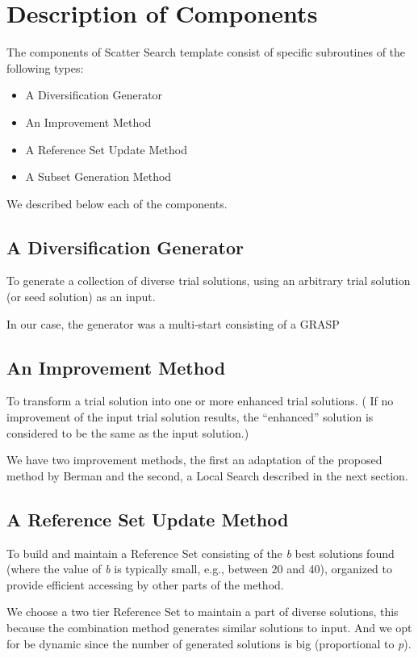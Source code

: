 \section{Description of Components}
The components of Scatter Search template \cite{glover1998template}
consist of
specific subroutines of the following types:
\begin{itemize}
\item A Diversification Generator
\item An Improvement Method
\item A Reference Set Update Method
\item A Subset Generation Method
\end{itemize}
We described below
each of the components.

\subsection{A Diversification Generator}
To generate
a collection of diverse trial solutions,
using an arbitrary trial solution
(or seed solution) as an input.

In our case,
the generator was a multi-start
consisting of a GRASP


\subsection{An Improvement Method}
To transform
a trial solution
into one or more enhanced trial solutions. 
(
If no improvement
of the input trial solution results, 
the ``enhanced'' solution
is considered to be
the same as the input solution.)

We have two improvement methods,
the first an adaptation
of the proposed method by Berman
and the second,
a Local Search
described in the next section.

\subsection{A Reference Set Update Method}
To build and maintain a Reference Set
consisting of the \textit{b} best solutions found
(where the value of \textit{b}
is typically small,
e.g., between 20 and 40),
organized to provide efficient accessing
by other parts of the method.

We choose
a two tier Reference Set
to maintain a part of diverse solutions,
this because the combination method
generates similar solutions to input.
And we opt for be dynamic
since the number
of generated solutions
is big (proportional to \textit{p}).

